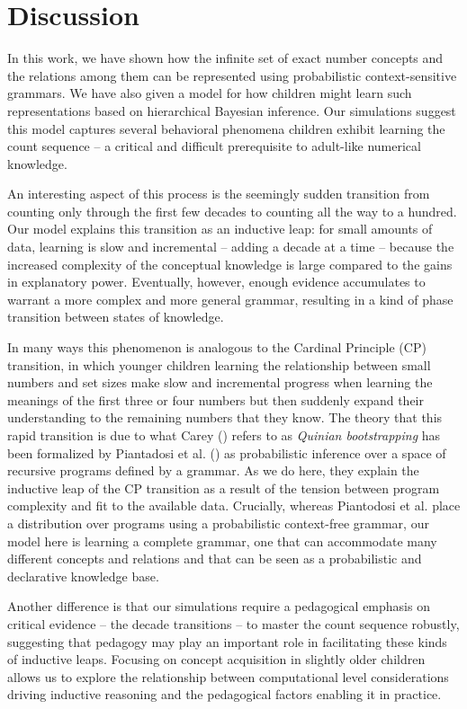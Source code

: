 \documentclass[10pt,letterpaper]{article}
\begin{document}
\section{Discussion}

In this work, we have shown how the infinite set of exact number
concepts and the relations among them can be represented using
probabilistic context-sensitive grammars. We have also given a model
for how children might learn such representations based on
hierarchical Bayesian inference. Our simulations suggest this model
captures several behavioral phenomena children exhibit learning the count
sequence -- a critical and difficult prerequisite to adult-like
numerical knowledge.

An interesting aspect of this process is the seemingly sudden
transition from counting only through the first few decades to
counting all the way to a hundred. Our model explains this transition
as an inductive leap: for small amounts of data, learning is slow and
incremental -- adding a decade at a time -- because the increased
complexity of the conceptual knowledge is large compared to the gains
in explanatory power. Eventually, however, enough evidence accumulates
to warrant a more complex and more general grammar, resulting
in a kind of phase transition between states of knowledge.

In many ways this phenomenon is analogous to the Cardinal Principle
(CP) transition, in which younger children learning the relationship
between small numbers and set sizes make slow and incremental progress
when learning the meanings of the first three or four numbers but then
suddenly expand their understanding to the remaining numbers that
they know. The theory that this rapid transition is due to what Carey
(\citeyear{Car2009}) refers to as \emph{Quinian bootstrapping} has
been formalized by Piantadosi et al. (\citeyear{PianGoodTen2012}) as
probabilistic inference over a space of recursive programs defined by
a grammar. As we do here, they explain the inductive leap of the CP
transition as a result of the tension between program complexity and
fit to the available data. Crucially, whereas Piantodosi et al. place
a distribution over programs using a probabilistic context-free
grammar, our model here is learning a complete grammar, one that can
accommodate many different concepts and relations and that can be seen
as a probabilistic and declarative knowledge base.

Another difference is that our simulations require a pedagogical
emphasis on critical evidence -- the decade transitions -- to master
the count sequence robustly, suggesting that pedagogy may play an
important role in facilitating these kinds of inductive leaps.
Focusing on concept acquisition in slightly older children allows us
to explore the relationship between computational level considerations
driving inductive reasoning and the pedagogical factors enabling it in
practice.
\end{document}
